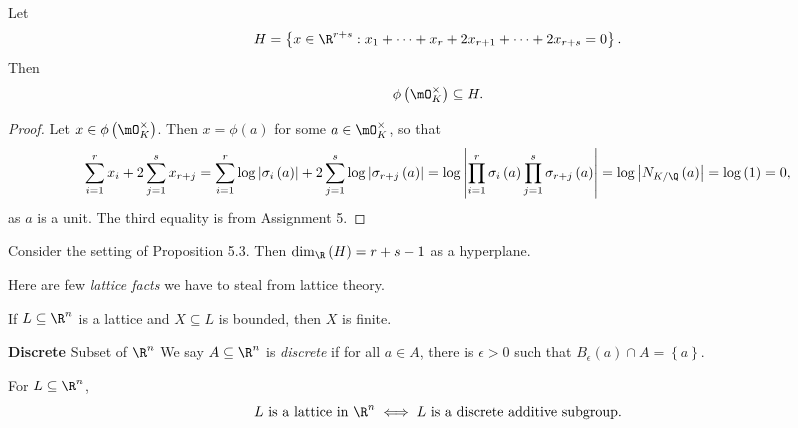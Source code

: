\documentclass[pmath441]{subfiles}
\begin{document}
    \rruleline

    \begin{prop}{}
        Let
        \begin{equation*}
            H = \left\lbrace x\in\R^{r+s}:x_1+\cdots+x_r+2x_{r+1}+\cdots+2x_{r+s}=0 \right\rbrace.
        \end{equation*}
        Then
        \begin{equation*}
            \phi\left( \mO_K^\times \right)\subseteq H.
        \end{equation*}
    \end{prop}

    \begin{proof}
        Let $x\in\phi\left( \mO_K^{\times} \right)$. Then $x=\phi\left( a \right)$ for some $a\in\mO_K^\times$, so that
        \begin{equation*}
            \sum^{r}_{i=1} x_i + 2\sum^{s}_{j=1}x_{r+j} = \sum^{r}_{i=1}\log\left| \sigma_i\left( a \right) \right| + 2\sum^{s}_{j=1}\log\left| \sigma_{r+j}\left( a \right) \right| = \log\left| \prod^{r}_{i=1}\sigma_i\left( a \right)\prod^{s}_{j=1}\sigma_{r+j}\left( a \right) \right| = \log\left| N_{K /\Q}\left( a \right) \right| = \log\left( 1 \right) = 0,
        \end{equation*}
        as $a$ is a unit. The third equality is from Assignment 5.
    \end{proof}
    
    \clearpage

    \np Consider the setting of Proposition 5.3. Then $\dim_{\R}\left( H \right) = r+s-1$ as a hyperplane.

    \np Here are few \textit{lattice facts} we have to steal from lattice theory.

    \begin{fact}{}
        If $L\subseteq\R^n$ is a lattice and $X\subseteq L$ is bounded, then $X$ is finite.
    \end{fact}

    \begin{definition}{\textbf{Discrete} Subset of $\R^n$}
        We say $A\subseteq\R^n$ is \emph{discrete} if for all $a\in A$, there is $\epsilon>0$ such that $B_{\epsilon}\left( a \right)\cap A = \left\lbrace a \right\rbrace$.
    \end{definition}

    \begin{fact}{}
        For $L\subseteq\R^n$,
        \begin{equation*}
            L\text{ is a lattice in $\R^n$} \iff L\text{ is a discrete additive subgroup}.
        \end{equation*}
    \end{fact}
    
\end{document}

